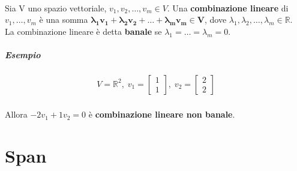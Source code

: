 \documentclass[a4paper, 12pt]{report}
\begin{document}
                \paragraph{}Sia V uno spazio vettoriale, $v_1,v_2,\dots,v_m \in V$.
                Una \textbf{combinazione lineare} di $v_1,\dots,v_m$ è una somma $\boldsymbol{\lambda_1 v_1+\lambda_2 v_2+\dots+\lambda_m v_m \in V}$, dove $\lambda_1,\lambda_2,\dots,\lambda_m \in \mathbb{R}$.\\
                La combinazione lineare è detta \textbf{banale} se $\lambda_1=\dots=\lambda_m=0$.
                \subparagraph{Esempio}
                    $$
                    V=\mathbb{R}^2,\;v_1=
                    \begin{bmatrix}
                        1\\
                        1
                    \end{bmatrix}
                    ,\;v_2=
                    \begin{bmatrix}
                        2\\
                        2
                    \end{bmatrix}
                    $$
                    \subparagraph{}Allora $-2v_1+1v_2=0$ è \textbf{combinazione lineare non banale}.
        \section{Span}
\end{document}
